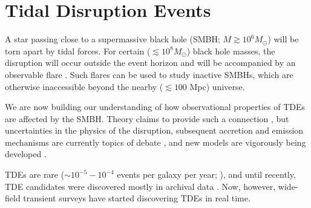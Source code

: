 %
%
%
%
%
%
%
%

\section{Tidal Disruption Events}
\def\secname{tdes}\label{sec:\secname} %


A star passing close to a supermassive black hole (SMBH; $M\gtrsim10^{6}M_{\odot}$)
will be torn apart by tidal forces. For certain ($\lesssim10^{8}M_{\odot}$)
black hole masses, the disruption will occur outside the event horizon
and will be accompanied by an observable flare .
Such flares can be used to study inactive SMBHs, which are otherwise
inaccessible beyond the nearby ($\lesssim100$ Mpc) universe. 

We are now building our understanding of how observational
properties of TDEs are affected by the SMBH. Theory claims to provide
such a connection \citep[e.g.]{Lodato2009, Guillochon2014},
but uncertainties in the physics of the disruption, subsequent accretion
and emission mechanisms are currently topics of debate \citep[e.g.]{Strubbe2015, Guillochon2014, Roth2015}, 
and new models are vigorously being developed \citep[e.g.]{Piran2015, Hayasaki2015, Svirski2015, Bonnerot2016}. 

TDEs are rare ($\sim10^{-5}-10^{-4}$ events per galaxy per year; \citealp{Wang2004, 
Stone2016}), and until recently, TDE candidates were discovered 
mostly in archival data \citep[e.g.]{Donley2002, Gezari2006, Esquej2007}. Now, however, wide-field transient
surveys have started discovering TDEs in real time.

